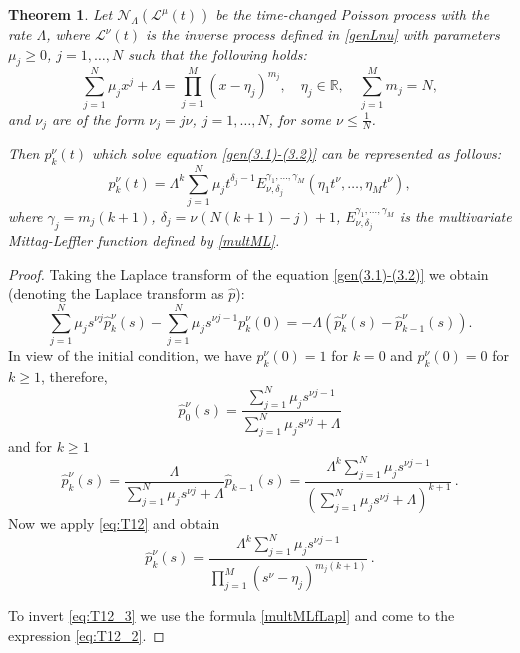 \documentclass[12pt]{article}
\theoremstyle{definition}
\theoremstyle{plain}
\newtheorem{theorem}{Theorem}
\begin{document}
\begin{theorem}
	Let $\mathcal N_\Lambda(\mathcal{L}^\mu(t))$ be the time-changed Poisson process with the rate $\Lambda$, where $\mathcal{L}^\nu(t)$ is the inverse process defined in 
	\eqref{genLnu} with parameters $\mu_j\ge0$, $j=1,\dots,N$ such that the following holds:
	\begin{equation} \label{eq:T12}
		\sum_{j=1}^N \mu_j x^j + \Lambda = \prod_{j=1}^M (x-\eta_j)^{m_j}, \quad \eta_j \in \mathbb{R}, \quad \sum_{j=1}^M m_j=N,
	\end{equation}
	and $\nu_j$ are of the form $\nu_j = j\nu$, $j=1,\dots,N$, for some $\nu \leq \frac{1}{N}$.
	
	Then $p_k^\nu(t)$ which solve equation 
	\eqref{gen(3.1)-(3.2)} can be represented as follows:
	\begin{equation} \label{eq:T12_2}
		p_k^\nu(t) = \Lambda^k \sum_{j=1}^N \mu_j t^{\delta_j - 1} E_{\nu, \delta_j}^{\gamma_1, \dots, \gamma_M} (\eta_1 t^\nu, \dots, \eta_M t^\nu),
	\end{equation}
	where $\gamma_j = m_j(k+1)$, $\delta_j = \nu(N(k+1)-j)+1$, $E_{\nu, \delta_j}^{\gamma_1, \dots, \gamma_M}$ is the multivariate Mittag-Leffler function defined by \eqref{multML}.
			\end{theorem}

\begin{proof}
	Taking the Laplace transform of the equation 
	\eqref{gen(3.1)-(3.2)} we obtain (denoting the Laplace transform as $\hat p$):
	\begin{equation*}
		\sum_{j=1}^N \mu_j s^{\nu j} \hat{p}_k^\nu(s) - \sum_{j=1}^N \mu_j s^{\nu j - 1} p_k^\nu(0) = -\Lambda(\hat{p}_k^\nu(s) - \hat{p}_{k-1}^\nu(s)).
	\end{equation*}
	In view of the initial condition, we have $p_k^\nu(0)=1$ for $k=0$ and $p_k^\nu(0)=0$ for $k \geq 1$, therefore,
	\begin{equation*}
		\hat{p}_0^\nu(s) = \frac{\sum_{j=1}^N \mu_j s^{\nu j - 1}}{\sum_{j=1}^N \mu_j s^{\nu j} + \Lambda}
	\end{equation*}
	and for $k \geq 1$
	\begin{equation*}
		\hat{p}_k^\nu(s) = \frac{\Lambda}{\sum_{j=1}^N \mu_j s^{\nu j} + \Lambda} \hat{p}_{k-1}(s) = \frac{\Lambda^k \sum_{j=1}^N \mu_j s^{\nu j - 1}}{\left(\sum_{j=1}^N \mu_j s^{\nu j} + \Lambda\right)^{k+1}}\, .
	\end{equation*}
	Now we apply \eqref{eq:T12} and obtain
	\begin{equation} \label{eq:T12_3}
		\hat{p}_k^\nu(s) = \frac{\Lambda^k \sum_{j=1}^N \mu_j s^{\nu j - 1}}{\prod_{j=1}^M (s^\nu - \eta_j)^{m_j(k+1)}}\, .
	\end{equation}
	
	To invert \eqref{eq:T12_3} we use the formula \eqref{multMLfLapl} and come to the expression \eqref{eq:T12_2}.
\end{proof}
\end{document}
